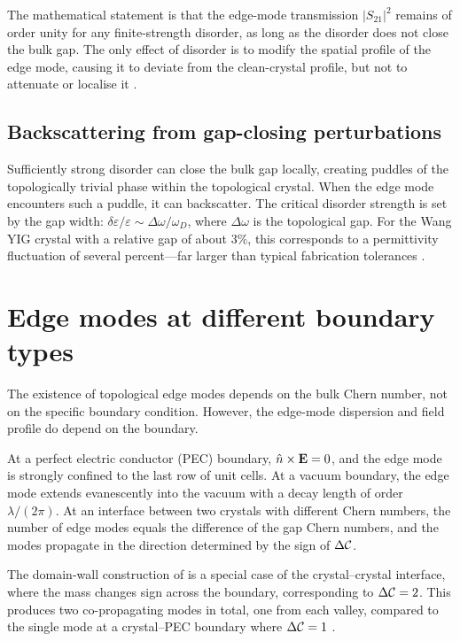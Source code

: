 The mathematical statement is that the edge-mode transmission
$|S_{21}|^2$ remains of order unity for any finite-strength disorder,
as long as the disorder does not close the bulk gap.  The only effect
of disorder is to modify the spatial profile of the edge mode,
causing it to deviate from the clean-crystal profile, but not to
attenuate or localise it \cite{haldane2008possible}.

\subsection{Backscattering from gap-closing perturbations}
\label{sec:ch8-gap-closing}

Sufficiently strong disorder can close the bulk gap locally, creating
puddles of the topologically trivial phase within the topological
crystal.  When the edge mode encounters such a puddle, it can
backscatter.  The critical disorder strength is set by the gap width:
$\delta\varepsilon/\varepsilon\sim\Delta\omega/\omega_D$, where
$\Delta\omega$ is the topological gap.  For the Wang YIG crystal with
a relative gap of about $3\%$, this corresponds to a permittivity
fluctuation of several percent---far larger than typical fabrication
tolerances \cite{nature2026observation,price2022roadmap}.

\section{Edge modes at different boundary types}
\label{sec:ch8-boundary-types}

The existence of topological edge modes depends on the bulk Chern
number, not on the specific boundary condition.  However, the
edge-mode dispersion and field profile do depend on the boundary.

At a perfect electric conductor (PEC) boundary,
$\hat{n}\times\mathbf{E}=0$, and the edge mode is strongly confined to
the last row of unit cells.  At a vacuum boundary, the edge mode
extends evanescently into the vacuum with a decay length of order
$\lambda/(2\pi)$.  At an interface between two crystals with different
Chern numbers, the number of edge modes equals the difference of the
gap Chern numbers, and the modes propagate in the direction determined
by the sign of $\Delta\mathcal{C}$.

The domain-wall construction of  is a special
case of the crystal--crystal interface, where the mass changes sign
across the boundary, corresponding to $\Delta\mathcal{C}=2$.  This
produces two co-propagating modes in total, one from each valley, compared to the single
mode at a crystal--PEC boundary where $\Delta\mathcal{C}=1$
\cite{ozawa2018topological,thouless1982quantized}.

